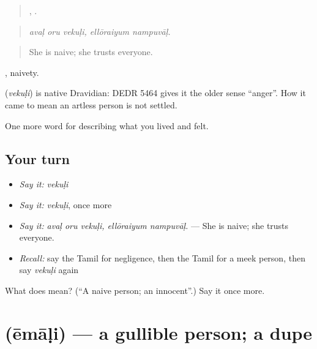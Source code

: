 \begin{quote}
  ,  .
\end{quote}

\begin{quote}
\emph{avaḷ oru vekuḷi, ellōraiyum nampuvāḷ.}
\end{quote}

\begin{quote}
She is naive; she trusts everyone.
\end{quote}

, naivety.

\begin{cousinweb}
\textbf{} (\emph{vekuḷi}) is native Dravidian: DEDR 5464 gives it the older sense \textquotedblleft{}anger\textquotedblright{}. How it came to mean an artless person is not settled.
\end{cousinweb}

\begin{grammarlens}[title={What you've built}]
One more word for describing what you lived and felt.
\end{grammarlens}

\subsection*{Your turn}
\begin{itemize}
\raggedright
  \item \emph{Say it:} \emph{vekuḷi}
  \item \emph{Say it:} \emph{vekuḷi}, once more
  \item \emph{Say it:} \emph{avaḷ oru vekuḷi, ellōraiyum nampuvāḷ.} — She is naive; she trusts everyone.
  \item \emph{Recall:} say the Tamil for negligence, then the Tamil for a meek person, then say \emph{vekuḷi} again
\end{itemize}

\begin{tcolorbox}[breakable,colback=teal!4,colframe=teal!35!black,title={Before you move on}]
What does  mean? (\textquotedblleft{}A naive person; an innocent\textquotedblright{}.) Say it once more.
\end{tcolorbox}
\section[\texorpdfstring{\ta{ஏமாளி} (ēmāḷi)}{ஏமாளி (ēmāḷi)}]{ (ēmāḷi) — a gullible person; a dupe}

